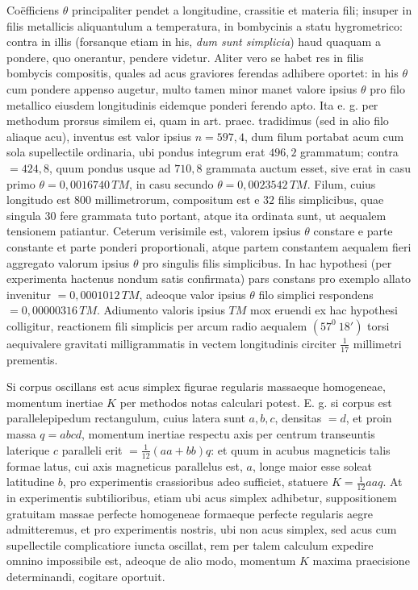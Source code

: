 Coëfficiens $\theta$ principaliter pendet a longitudine, crassitie et materia fili; insuper in filis metallicis aliquantulum a temperatura, in bombycinis a statu hygrometrico: contra in illis (forsanque etiam in his, \textit{dum sunt simplicia}) haud quaquam a pondere, quo onerantur, pendere videtur. Aliter vero se habet res in filis bombycis compositis, quales ad acus graviores ferendas adhibere oportet: in his $\theta$ cum pondere appenso augetur, multo tamen minor manet valore ipsius $\theta$ pro filo metallico eiusdem longitudinis eidemque ponderi ferendo apto. Ita e. g. per methodum prorsus similem ei, quam in art. praec. tradidimus (sed in alio filo aliaque acu), inventus est valor ipsius $n=597{,}4$, dum filum portabat acum cum sola supellectile ordinaria, ubi pondus integrum erat $496{,}2$ grammatum; contra $=424{,}8$, quum pondus usque ad $710{,}8$ grammata auctum esset, sive erat in casu primo $\theta=0{,}0016740\,TM$, in casu secundo $\theta=0{,}0023542\,TM$. Filum, cuius longitudo est $800$ millimetrorum, compositum est e $32$ filis simplicibus, quae singula $30$ fere grammata tuto portant, atque ita ordinata sunt, ut aequalem tensionem patiantur. Ceterum verisimile est, valorem ipsius $\theta$ constare e parte constante et parte ponderi proportionali, atque partem constantem aequalem fieri aggregato valorum ipsius $\theta$ pro singulis filis simplicibus. In hac hypothesi (per experimenta hactenus nondum satis confirmata) pars constans pro exemplo allato invenitur $=0{,}0001012\,TM$, adeoque valor ipsius $\theta$ filo simplici respondens $=0{,}00000316\,TM$. Adiumento valoris ipsius $TM$ mox eruendi ex hac hypothesi colligitur, reactionem fili simplicis per arcum radio aequalem $(57^0\ 18')$ torsi aequivalere gravitati milligrammatis in vectem longitudinis circiter $\frac1{17}$ millimetri prementis.

Si corpus oscillans est acus simplex figurae regularis massaeque homogeneae, momentum inertiae $K$ per methodos notas calculari potest. E. g. si corpus est parallelepipedum rectangulum, cuius latera sunt $a,b,c$, densitas $=d$, et proin massa $q=abcd$, momentum inertiae respectu axis per centrum transeuntis laterique $c$ paralleli erit $=\frac1{12}(aa+bb)q$: et quum in acubus magneticis talis formae latus, cui axis magneticus parallelus est, $a$, longe maior esse soleat latitudine $b$, pro experimentis crassioribus adeo sufficiet, statuere $K=\frac1{12}aaq$. At in experimentis subtilioribus, etiam ubi acus simplex adhibetur, suppositionem gratuitam massae perfecte homogeneae formaeque perfecte regularis aegre admitteremus, et pro experimentis nostris, ubi non acus simplex, sed acus cum supellectile complicatiore iuncta oscillat, rem per talem calculum expedire omnino impossibile est, adeoque de alio modo, momentum $K$ maxima praecisione determinandi, cogitare oportuit.

